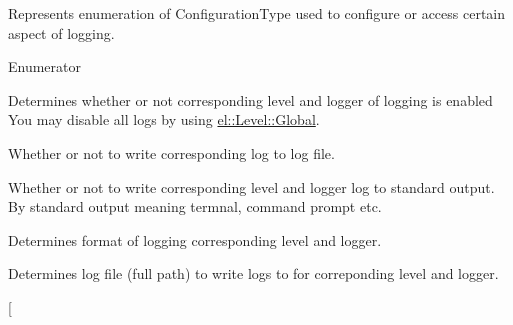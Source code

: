 Represents enumeration of Configuration\+Type used to configure or access certain aspect of logging. 

\begin{Desc}
\item[Enumerator]\par
\begin{description}
\item[{\em 
\hypertarget{namespaceel_a281f5db6d6163678bc68a8b23b59e124a00d23a76e43b46dae9ec7aa9dcbebb32}{}Enabled\label{namespaceel_a281f5db6d6163678bc68a8b23b59e124a00d23a76e43b46dae9ec7aa9dcbebb32}
}]Determines whether or not corresponding level and logger of logging is enabled You may disable all logs by using \hyperlink{namespaceel_ab0ac6091262344c52dd2d3ad099e8e36a4cc6684df7b4a92b1dec6fce3264fac8}{el\+::\+Level\+::\+Global}. \item[{\em 
\hypertarget{namespaceel_a281f5db6d6163678bc68a8b23b59e124acb76297988b895ca263f62728b32dbcc}{}To\+File\label{namespaceel_a281f5db6d6163678bc68a8b23b59e124acb76297988b895ca263f62728b32dbcc}
}]Whether or not to write corresponding log to log file. \item[{\em 
\hypertarget{namespaceel_a281f5db6d6163678bc68a8b23b59e124a9b9a9244b0b26da988f9af8310ab899d}{}To\+Standard\+Output\label{namespaceel_a281f5db6d6163678bc68a8b23b59e124a9b9a9244b0b26da988f9af8310ab899d}
}]Whether or not to write corresponding level and logger log to standard output. By standard output meaning termnal, command prompt etc. \item[{\em 
\hypertarget{namespaceel_a281f5db6d6163678bc68a8b23b59e124a520d0db389f362bf79ef56ca0af3dcab}{}Format\label{namespaceel_a281f5db6d6163678bc68a8b23b59e124a520d0db389f362bf79ef56ca0af3dcab}
}]Determines format of logging corresponding level and logger. \item[{\em 
\hypertarget{namespaceel_a281f5db6d6163678bc68a8b23b59e124a1351017ac6423911223bc19a8cb7c653}{}Filename\label{namespaceel_a281f5db6d6163678bc68a8b23b59e124a1351017ac6423911223bc19a8cb7c653}
}]Determines log file (full path) to write logs to for correponding level and logger. \item[{\em 
}
\end{description}
\end{Desc}
